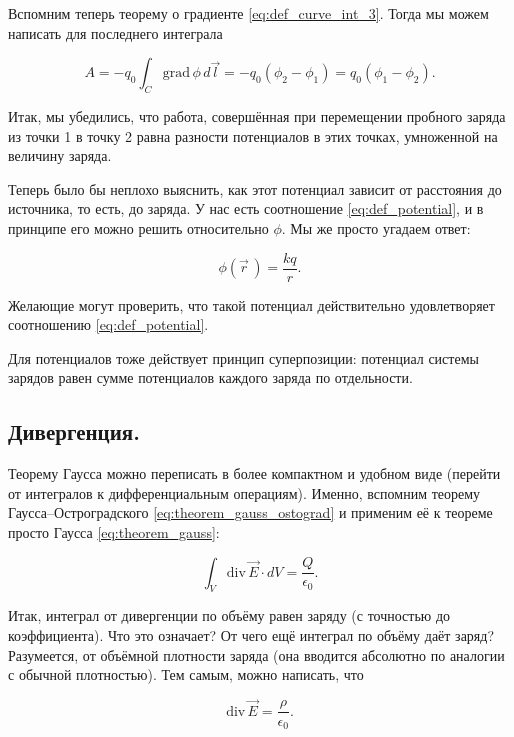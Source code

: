 \documentclass[11pt,a4paper]{article}
\numberwithin{equation}{section}
\newcommand{\grad}{\mathrm{grad}\,}
\renewcommand{\div}{\mathrm{div}\,}
\newcommand{\eps}{\epsilon}
\begin{document}
Вспомним теперь теорему о градиенте \eqref{eq:def_curve_int_3}. Тогда
мы можем написать для последнего интеграла

\begin{equation}
  \label{eq:work_statics_2}
  A = -q_0 \int_C \grad \phi\, d\vec{l} = -q_0 (\phi_2 - \phi_1) = q_0
  (\phi_1 - \phi_2). 
\end{equation}

Итак, мы убедились, что работа, совершённая при перемещении пробного
заряда из точки 1 в точку 2 равна разности потенциалов в этих точках,
умноженной на величину заряда. 

Теперь было бы неплохо выяснить, как этот потенциал зависит от
расстояния до источника, то есть, до заряда. У нас есть соотношение
\eqref{eq:def_potential}, и в принципе его можно решить относительно
$\phi$. Мы же просто угадаем ответ:

\begin{equation}
  \label{eq:potential_r}
  \phi(\vec{r}\,) = \frac{kq}{r}. 
\end{equation}

Желающие могут проверить, что такой потенциал действительно
удовлетворяет соотношению \eqref{eq:def_potential}. 

Для потенциалов тоже действует принцип суперпозиции: потенциал системы
зарядов равен сумме потенциалов каждого заряда по отдельности. 

\subsection{Дивергенция.}
\label{sec:statics_div}

Теорему Гаусса можно переписать в более компактном и удобном виде
(перейти от интегралов к дифференциальным операциям). Именно, вспомним
теорему Гаусса--Остроградского \eqref{eq:theorem_gauss_ostograd} и
применим её к теореме просто Гаусса \eqref{eq:theorem_gauss}:

\begin{equation}
  \label{eq:statics_div_1}
  \int_V \div \vec{E} \cdot dV = \frac{Q}{\eps_0}.
\end{equation}

Итак, интеграл от дивергенции по объёму равен заряду (с точностью до
коэффициента). Что это означает? От чего ещё интеграл по объёму даёт
заряд? Разумеется, от объёмной плотности заряда (она вводится
абсолютно по аналогии с обычной плотностью). Тем самым, можно
написать, что 

\begin{equation}
  \label{eq:statics_div_2}
  \div \vec{E} = \frac{\rho}{\eps_0}.
\end{equation}
\end{document}
